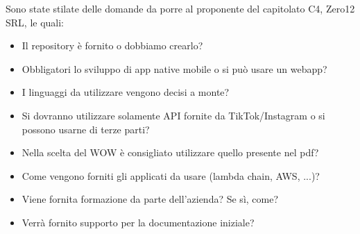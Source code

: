 \documentclass{classes/base}
\begin{document}
    Sono state stilate delle domande da porre al proponente del capitolato C4, Zero12 SRL, le quali:
    \begin{itemize}
        \item  Il repository è fornito o dobbiamo crearlo?
        \item  Obbligatori lo sviluppo di app native mobile o si può usare un webapp?
        \item  I linguaggi da utilizzare vengono decisi a monte?
        \item  Si dovranno utilizzare solamente API fornite da TikTok/Instagram o si possono usarne di terze parti?
        \item  Nella scelta del WOW è consigliato utilizzare quello presente nel pdf?
        \item  Come vengono forniti gli applicati da usare (lambda chain, AWS, ...)?
        \item  Viene fornita formazione da parte dell'azienda? Se sì, come?
        \item  Verrà fornito supporto per la documentazione iniziale?
    \end{itemize}
\end{document}
